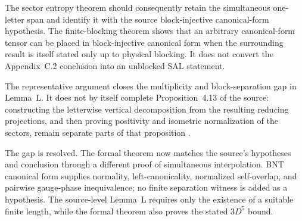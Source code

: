 \documentclass{article}
\begin{document}
The sector entropy theorem should consequently retain the simultaneous
one-letter span and identify it with the source block-injective canonical-form
hypothesis. The finite-blocking theorem shows that an arbitrary canonical-form
tensor can be placed in block-injective canonical form when the surrounding
result is itself stated only up to physical blocking. It does not convert the
Appendix~C.2 conclusion into an unblocked SAL statement.

The representative argument closes the multiplicity and block-separation gap
in Lemma~L. It does not by itself complete Proposition~4.13 of the source:
constructing the letterwise vertical decomposition from the resulting reducing
projections, and then proving positivity and isometric normalization of the
sectors, remain separate parts of that proposition
\cite{Cirac2016MPDO_arXiv}.

The gap is resolved. The formal theorem now matches the source's hypotheses and
conclusion through a different proof of simultaneous interpolation. BNT
canonical form supplies normality, left-canonicality, normalized self-overlap,
and pairwise gauge-phase inequivalence; no finite separation witness is added
as a hypothesis. The source-level Lemma~L requires only the existence of a
suitable finite length, while the formal theorem also proves the stated
$3D^5$ bound.



\end{document}
